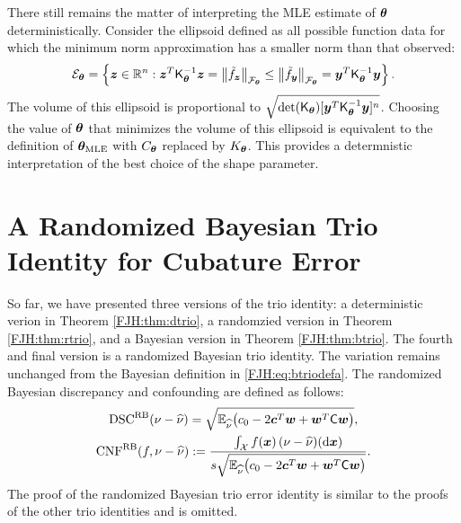 \documentclass[graybox,footinfo]{svmult}
\begin{document}
There still remains the matter of interpreting the MLE estimate of ${\boldsymbol{\theta}}$ 
deterministically.  Consider the ellipsoid defined as all possible function data for 
which the minimum norm approximation has a smaller norm than that observed:
\[
{\mathcal{E}}_{\boldsymbol{\theta}} = \left\{ {\boldsymbol{z}} \in {\mathbb{R}}^n :  {\boldsymbol{z}}^T 
\mathsf{K}_{\boldsymbol{\theta}}^{-1} {\boldsymbol{z}} = \left \lVert \tilde{f}_{\boldsymbol{z}} \right \rVert_{{\mathcal{F}}_{\boldsymbol{\theta}}} \le 
\left \lVert \tilde{f}_{\boldsymbol{y}} \right \rVert_{{\mathcal{F}}_{\boldsymbol{\theta}}} =  {\boldsymbol{y}}^T 
\mathsf{K}_{\boldsymbol{\theta}}^{-1} {\boldsymbol{y}} \right\}.
\]
The volume of this ellipsoid is proportional to $\sqrt{\det(\mathsf{K}_{\boldsymbol{\theta}}) [ {\boldsymbol{y}}^T 
	\mathsf{K}_{\boldsymbol{\theta}}^{-1} {\boldsymbol{y}}]^n}$.  Choosing the value of ${\boldsymbol{\theta}}$ that minimizes 
	the volume of this ellipsoid is equivalent to the definition of ${\boldsymbol{\theta}}_{\text{MLE}}$ with 
	$C_{\boldsymbol{\theta}}$ replaced by $K_{\boldsymbol{\theta}}$.  This provides a determnistic interpretation of 
	the best choice of the shape parameter.
	
\begin{FJHLesson}
	\FJHLessonNine
\end{FJHLesson}

\section{A Randomized Bayesian Trio Identity for Cubature Error}

So far, we have presented three versions of the trio identity: a deterministic verion  in 
Theorem \ref{FJH:thm:dtrio}, a randomzied version in Theorem \ref{FJH:thm:rtrio}, and a 
Bayesian 
version in Theorem \ref{FJH:thm:btrio}.  The fourth and final version is a randomized 
Bayesian trio identity.  The variation remains unchanged from the Bayesian definition in 
\eqref{FJH:eq:btriodefa}.  
The randomized Bayesian discrepancy and confounding are defined as follows:
\begin{subequations} \label{FJH:eq:rbtriodef}
	\begin{gather}
	\label{FJH:eq:bbtriodefa}
\disc^{\Rn\Ba}(\nu - \hnu) = \sqrt{\bbE_{\hnu}  \bigl(c_0 - 
		2 \bsc^T \bsw + \bsw ^T \mC \bsw \bigr)},\\
	\algn^{\Rn\Ba}(f,\nu - \hnu) :=\frac{ \int_{\calX} 
		f(\bsx) \, (\nu - \hnu)(\D\bsx)}{s  \sqrt{\bbE_{\hnu}  \bigl(c_0 - 
			2 \bsc^T \bsw + \bsw ^T \mC \bsw \bigr)}}.
	\end{gather}
\end{subequations}
The proof of the randomized Bayesian trio error identity is similar to the proofs of the 
other trio identities and is omitted.
\end{document}
